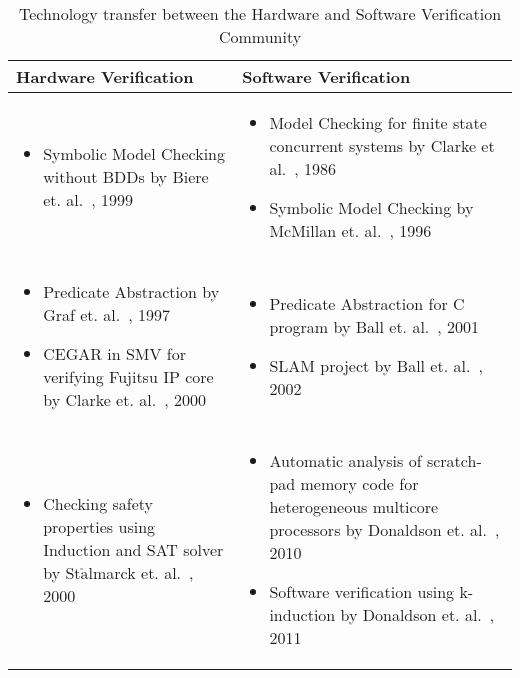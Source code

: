 \begin{table}[]
\centering
\scriptsize
\caption{Technology transfer between the Hardware and Software Verification Community}
\label{timeline}
\begin{tabular}{p{}|p{}}
\toprule
  Hardware Verification & Software Verification \\
  \midrule
  \begin{itemize}
  \item Symbolic Model Checking without BDDs 
    by Biere et. al.~\cite{tacas99}, 1999
\end{itemize}
 & 
 \begin{itemize}
  \item Model Checking for finite state concurrent systems by Clarke et
    al.~\cite{clarke86}, 1986
  \item Symbolic Model Checking by McMillan et. al.~\cite{mcmillan96}, 1996
\end{itemize} \\ \hline

 \begin{itemize}
 \item Predicate Abstraction by Graf et. al.~\cite{cav97}, 1997
 \item CEGAR in SMV for verifying Fujitsu IP core by Clarke et.
   al.~\cite{cav2000}, 2000 
 \end{itemize}
  &
  \begin{itemize}
    \item Predicate Abstraction for C program by Ball et. al.~\cite{pldi01},
      2001
    \item SLAM project by Ball et. al.~\cite{popl02}, 2002
  \end{itemize} \\ \hline
 
  \begin{itemize}
    \item Checking safety properties using Induction and SAT solver by
      St$\mathring{\text{a}}$lmarck et. al.~\cite{fmcad2000}, 2000
   \end{itemize}
   & 
   \begin{itemize}
     \item Automatic analysis of scratch-pad memory code for heterogeneous
       multicore processors by Donaldson et. al.~\cite{tacas10}, 2010
     \item Software verification using k-induction by Donaldson et.
       al.~\cite{sas2011}, 2011
   \end{itemize} \\ \hline
   

\end{tabular}
\end{table}
